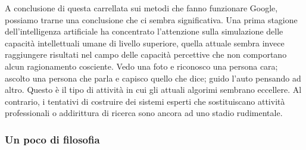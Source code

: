 \documentclass[xcolor=svgnames]{beamer}
\begin{document}
\begin{frame}
\begin{itemize}
A conclusione di questa carrellata sui metodi che fanno funzionare Google, possiamo trarne una conclusione che ci sembra significativa. Una prima stagione dell'intelligenza artificiale ha concentrato l'attenzione sulla simulazione delle capacità intellettuali umane di livello superiore, quella attuale sembra invece raggiungere risultati nel campo delle capacità percettive che non comportano alcun ragionamento cosciente. Vedo una foto e riconosco una persona cara; ascolto una persona che parla e capisco quello che dice; guido l'auto pensando ad altro. Questo è il tipo di attività in cui gli attuali algorimi sembrano eccellere. Al contrario, i tentativi di costruire dei sistemi esperti che sostituiscano attività professionali o addirittura di ricerca sono ancora ad uno stadio rudimentale.
\end{itemize}

\end{frame}

\begin{frame}\small\frametitle{Un poco di filosofia}
\end{frame}
\end{document}
